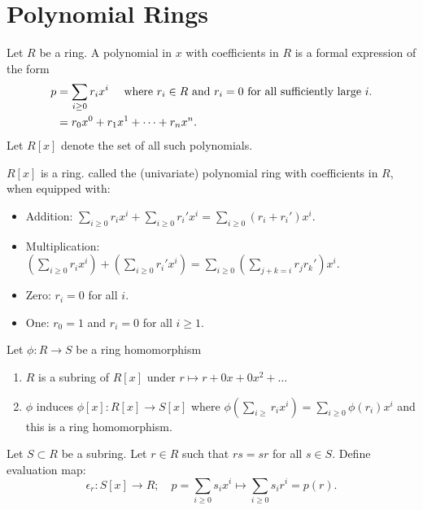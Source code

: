 \section{Polynomial Rings}

\begin{definition}[Polynomials]
    Let \(R\) be a ring. A polynomial in \(x\) with coefficients in \(R\) is a formal expression of the form
    \begin{align*}
        p &= \sum_{i \geq 0} r_i x^i \quad \text{ where } r_i \in R \text{ and } r_i = 0 \text{ for all sufficiently large } i. \\
        &= r_0 x^0 + r_1 x^1 + \dots + r_n x^n.
    \end{align*}
    Let \(R[x]\) denote the set of all such polynomials.
\end{definition}

\begin{prop-defn}
    \(R[x]\) is a ring. called the (univariate) polynomial ring with coefficients in \(R\), when equipped with:
    \begin{itemize}
        \item Addition: \(\sum_{i \geq 0} r_i x^i + \sum_{i \geq 0} r_i' x^i = \sum_{i \geq 0} (r_i + r_i')x^i.\)
        \item Multiplication: \(\left(\sum_{i \geq 0} r_i x^i\right) + \left(\sum_{i \geq 0} r_i' x^i\right) = \sum_{i \geq 0} \left(\sum_{j + k = i} r_j r_k'\right) x^i.\)
        \item Zero: \(r_i = 0\) for all \(i\).
        \item One: \(r_0 = 1\) and \(r_i = 0\) for all \(i \geq 1\).
    \end{itemize}
\end{prop-defn}

\begin{proposition}
    Let \(\phi: R \to S\) be a ring homomorphism
    \begin{enumerate}
        \item \(R\) is a subring of \(R[x]\) under \(r \mapsto r + 0x + 0x^2 + \dots\)
        \item \(\phi\) induces \(\phi[x]: R[x] \to S[x]\) where \(\phi\left(\sum_{i \geq} r_i x^i \right) = \sum_{i \geq 0} \phi(r_i)x^i\) and this is a ring homomorphism.
    \end{enumerate}
\end{proposition}

\begin{definition}
    Let \(S \subset R\) be a subring. Let \(r \in R\) such that \(rs = sr\) for all \(s \in S\). Define evaluation map:
    \[\epsilon_r: S[x] \to R; \quad p = \sum_{i \geq 0} s_i x^i \mapsto \sum_{i \geq 0} s_ir^i = p(r). \]
\end{definition}

